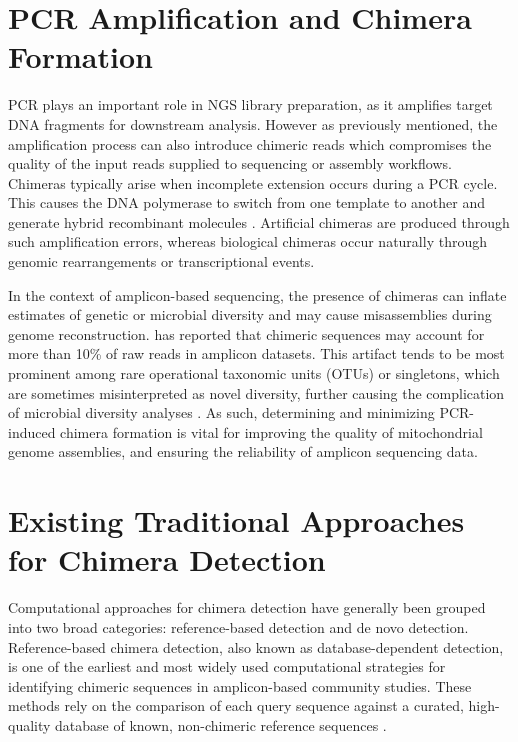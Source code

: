 \section{PCR Amplification and Chimera Formation}
PCR plays an important role in NGS library preparation, as it amplifies target DNA fragments for downstream analysis. However as previously mentioned, the amplification process can also introduce chimeric reads which compromises the quality of the input reads supplied to sequencing or assembly workflows. Chimeras typically arise when incomplete extension occurs during a PCR cycle. This causes the DNA polymerase to switch from one template to another and generate hybrid recombinant molecules \citep{Judo1998}. Artificial chimeras are produced through such amplification errors, whereas biological chimeras occur naturally through genomic rearrangements or transcriptional events.

In the context of amplicon-based sequencing, the presence of chimeras can inflate estimates of genetic or microbial diversity and may cause misassemblies during genome reconstruction. \cite{Qin2023} has reported that chimeric sequences may account for more than 10\% of raw reads in amplicon datasets. This artifact tends to be most prominent among rare operational taxonomic units (OTUs) or singletons, which are sometimes misinterpreted as novel diversity, further causing the complication of microbial diversity analyses \citep{Gonzalez2004}. As such, determining and minimizing PCR-induced chimera formation is vital for improving the quality of mitochondrial genome assemblies, and ensuring the reliability of amplicon sequencing data. 

\clearpage

\section{Existing Traditional Approaches for Chimera Detection} \label{sec:abundance_skew}
Computational approaches for chimera detection have generally been grouped into two broad categories: reference-based detection and de novo detection.
Reference-based chimera detection, also known as database-dependent detection, is one of the earliest and most widely used computational strategies for identifying chimeric sequences in amplicon-based community studies. These methods rely on the comparison of each query sequence against a curated, high-quality database of known, non-chimeric reference sequences \citep{Edgar2011}.

